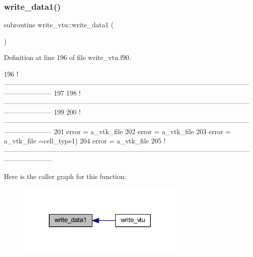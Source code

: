 \subsubsection{\texorpdfstring{write\+\_\+data1()}{write\_data1()}}
{\footnotesize\ttfamily subroutine write\+\_\+vtu\+::write\+\_\+data1 (\begin{DoxyParamCaption}{ }\end{DoxyParamCaption})}



Definition at line 196 of file write\+\_\+vtu.\+f90.


\begin{DoxyCode}
196   \textcolor{comment}{
      !---------------------------------------------------------------------------------------------------------------------------------}
197   
198   \textcolor{comment}{
      !---------------------------------------------------------------------------------------------------------------------------------}
199 
200   \textcolor{comment}{
      !---------------------------------------------------------------------------------------------------------------------------------}
201   error = a\_vtk\_file%
202   error = a\_vtk\_file%
203   error = a\_vtk\_file%
      =cell\_type1)
204   error = a\_vtk\_file%
205   \textcolor{comment}{
      !---------------------------------------------------------------------------------------------------------------------------------}
\end{DoxyCode}
Here is the caller graph for this function\+:\nopagebreak
\begin{figure}[H]
\begin{center}
\leavevmode
\includegraphics[width=236pt]{write__vtu_8f90_ae39ce165900c97fc318d09bf9670ac92_icgraph}
\end{center}
\end{figure}
\mbox{\label{write__vtu_8f90_ad806107886f0521aac56740b4a2aaf62}} 
